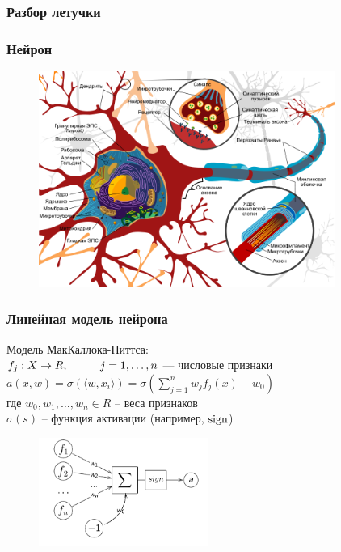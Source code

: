 \documentclass[12pt]{beamer}
\subtitle{Лекция 12. Нейронные сети.}
\begin{document}
	
\frame{\titlepage}

\begin{frame}\frametitle{Разбор летучки}

\end{frame}

\begin{frame}\frametitle{Нейрон}
\begin{figure}[htbp]
  \includegraphics[height=200pt, keepaspectratio = true]{images/neuron}   
\end{figure}

\end{frame}


\begin{frame}\frametitle{Линейная модель нейрона}
Модель МакКаллока-Питтса:\\
$f_j: X \rightarrow R, \hspace{10mm} j = 1,\dots, n$ — числовые признаки\\
$a(x,w) = \sigma(\langle w, x_i \rangle) = \sigma(\sum\limits_{j=1}^n w_j f_j(x) - w_0)$\\
где $w_0, w_1, \dots,w_n \in R$ -- веса признаков\\
$\sigma(s)$ -- функция активации (например, $\operatorname{sign}$)

\begin{figure}[htbp]
  \includegraphics[height=100pt, keepaspectratio = true]{images/neuron-scheme}   
\end{figure}

\end{frame}
\end{document}
